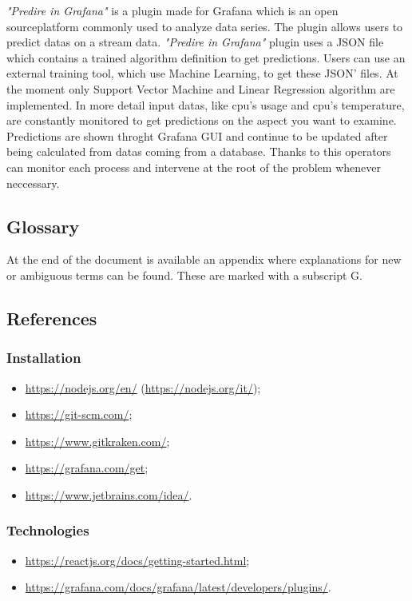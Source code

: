 \emph{"Predire in Grafana"} is a plugin made for Grafana which is an open source\glo platform commonly used to analyze data series. The plugin allows users to predict datas on a stream data. \emph{"Predire in Grafana"} plugin uses a JSON file which contains a trained algorithm definition to get predictions. Users can use an external training tool, which use Machine Learning\glo , to get these JSON' files. At the moment only Support Vector Machine and Linear Regression algorithm are implemented. In more detail input datas, like cpu's usage and cpu's temperature, are constantly monitored to get predictions on the aspect you want to examine. Predictions are shown throght Grafana GUI and continue to be updated after being calculated from datas coming from a database. Thanks to this operators can monitor each process and intervene at the root of the problem whenever neccessary.


\subsection{Glossary}
At the end of the document is available an appendix where explanations for new or ambiguous terms can be found. These are marked with a subscript G.

\subsection{References}
\subsubsection{Installation}
\begin{itemize}
	\item \url{https://nodejs.org/en/} (\url{https://nodejs.org/it/});
	\item \url{https://git-scm.com/};
	\item \url{https://www.gitkraken.com/};
	\item \url{https://grafana.com/get};
	\item \url{https://www.jetbrains.com/idea/}.
\end{itemize}
\subsubsection{Technologies}
\begin{itemize}
	\item \url{https://reactjs.org/docs/getting-started.html};
	\item \url{https://grafana.com/docs/grafana/latest/developers/plugins/}.
\end{itemize}
